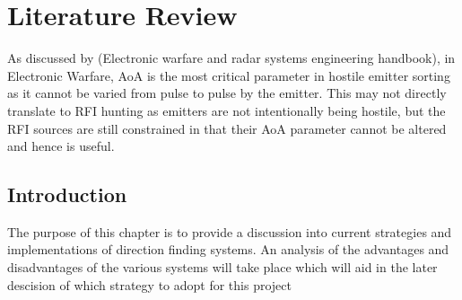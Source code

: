 \chapter{Literature Review}

As discussed by (Electronic warfare and radar systems engineering handbook), in Electronic Warfare, AoA is the most critical parameter in hostile emitter sorting as it cannot be varied from pulse to pulse by the emitter. This may not directly translate to RFI hunting as emitters are not intentionally being hostile, but the RFI sources are still constrained in that their AoA parameter cannot be altered and hence is useful. 

\section{Introduction}
The purpose of this chapter is to provide a discussion into current strategies and implementations of direction finding systems. An analysis of the advantages and disadvantages of the various systems will take place which will aid in the later descision of which strategy to adopt for this project




